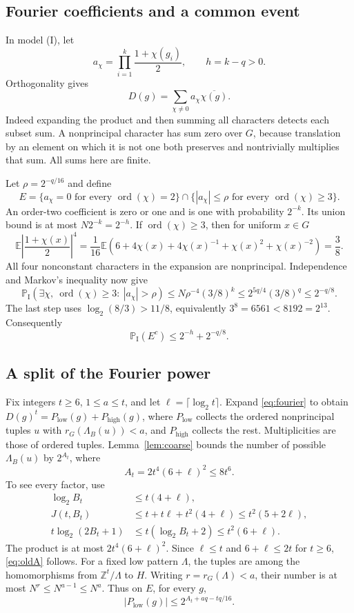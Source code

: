 \documentclass[11pt]{amsart}
\theoremstyle{remark}
\newcommand{\Z}{\mathbb Z}
\newcommand{\E}{\mathbb E}
\newcommand{\PI}{\mathbb P_{\mathrm I}}
\newcommand{\ord}{\operatorname{ord}}
\newcommand{\lo}{P_{\mathrm{low}}}
\newcommand{\hi}{P_{\mathrm{high}}}
\newcommand{\LB}{\Lambda_B}
\begin{document}
\subsection{Fourier coefficients and a common event}
In model \textup{(I)}, let
\[
 a_\chi=\prod_{i=1}^k\frac{1+\chi(g_i)}2,\qquad h=k-q>0.
\]
Orthogonality gives
\begin{equation}\label{eq:fourier}
 D(g)=\sum_{\chi\ne0}a_\chi\overline{\chi(g)}.
\end{equation}
Indeed expanding the product and then summing all characters detects
each subset sum. A nonprincipal character has sum zero over $G$,
because translation by an element on which it is not one both preserves
and nontrivially multiplies that sum. All sums here are finite.

Let $\rho=2^{-q/16}$ and define
\[
 E=\{a_\chi=0\text{ for every }\ord(\chi)=2\}
 \cap\{|a_\chi|\le\rho\text{ for every }\ord(\chi)\ge3\}.
\]
An order-two coefficient is zero or one and is one with probability
$2^{-k}$. Its union bound is at most $N2^{-k}=2^{-h}$. If
$\ord(\chi)\ge3$, then for uniform $x\in G$
\[
 \E\left|\frac{1+\chi(x)}2\right|^4
 =\frac1{16}\E(6+4\chi(x)+4\chi(x)^{-1}+\chi(x)^2+\chi(x)^{-2})
 =\frac38.
\]
All four nonconstant characters in the expansion are nonprincipal.
Independence and Markov's inequality now give
\[
 \PI(\exists\chi,\ \ord(\chi)\ge3:\ |a_\chi|>\rho)
 \le N\rho^{-4}(3/8)^k
 \le2^{5q/4}(3/8)^q\le2^{-q/8}.
\]
The last step uses $\log_2(8/3)>11/8$, equivalently
$3^8=6561<8192=2^{13}$. Consequently
\begin{equation}\label{eq:E}
 \PI(E^c)\le2^{-h}+2^{-q/8}.
\end{equation}

\subsection{A split of the Fourier power}
Fix integers $t\ge6$, $1\le a\le t$, and let $\ell=\lceil\log_2t\rceil$.
Expand \eqref{eq:fourier} to obtain $D(g)^t=\lo(g)+\hi(g)$, where
$\lo$ collects the ordered nonprincipal tuples $u$ with
$r_G(\LB(u))<a$, and $\hi$ collects the rest. Multiplicities are
those of ordered tuples. Lemma~\ref{lem:coarse} bounds the number of
possible $\LB(u)$ by $2^{A_t}$, where
\begin{equation}\label{eq:oldA}
 A_t=2t^4(6+\ell)^2\le8t^6.
\end{equation}
To see every factor, use
\begin{align*}
 \log_2B_t&\le t(4+\ell),\\
 J(t,B_t)&\le t+t\ell+t^2(4+\ell)\le t^2(5+2\ell),\\
 t\log_2(2B_t+1)&\le t(\log_2B_t+2)\le t^2(6+\ell).
\end{align*}
The product is at most $2t^4(6+\ell)^2$. Since $\ell\le t$ and
$6+\ell\le2t$ for $t\ge6$, \eqref{eq:oldA} follows. For a fixed
low pattern $\Lambda$, the tuples are among the homomorphisms from
$\Z^t/\Lambda$ to $H$. Writing $r=r_G(\Lambda)<a$, their number is
at most $N^r\le N^{a-1}\le N^a$. Thus on $E$, for every $g$,
\begin{equation}\label{eq:low}
 |\lo(g)|\le2^{A_t+aq-tq/16}.
\end{equation}
\end{document}
